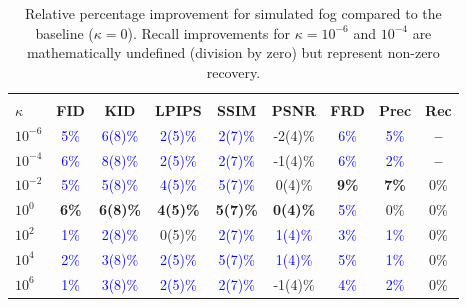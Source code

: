 \documentclass[twoside,11pt]{article}
\begin{document}
\begin{table}[ht!]
\centering
\renewcommand{\arraystretch}{1.4}
\setlength{\tabcolsep}{6pt}
\small
\begin{tabular}{lcccccccc}
\toprule
\rowcolor{gray!20}
\multicolumn{9}{c}{\textbf{Simulated Fog - Relative Improvement}} \\
\textbf{$\kappa$} & \textbf{FID} & \textbf{KID} & \textbf{LPIPS} & \textbf{SSIM} & \textbf{PSNR} & \textbf{FRD} & \textbf{Prec} & \textbf{Rec} \\
\midrule
$10^{-6}$    & \textcolor{blue}{5\%} & \textcolor{blue}{6(8)\%} & \textcolor{blue}{2(5)\%} & \textcolor{blue}{2(7)\%} & -2(4)\% & \textcolor{blue}{6\%} & \textcolor{blue}{5\%} & \textbf{\textcolor{green!50!black}{--}} \\
$10^{-4}$    & \textcolor{blue}{6\%} & \textcolor{blue}{8(8)\%} & \textcolor{blue}{2(5)\%} & \textcolor{blue}{2(7)\%} & -1(4)\% & \textcolor{blue}{6\%} & \textcolor{blue}{2\%} & \textbf{\textcolor{green!50!black}{--}} \\
$10^{-2}$    & \textcolor{blue}{5\%} & \textcolor{blue}{5(8)\%} & \textcolor{blue}{4(5)\%} & \textcolor{blue}{5(7)\%} & 0(4)\% & \textbf{\textcolor{green!50!black}{9\%}} & \textbf{\textcolor{green!50!black}{7\%}} & 0\% \\
$10^{0}$     & \textbf{\textcolor{green!50!black}{6\%}} & \textbf{\textcolor{green!50!black}{6(8)\%}} & \textbf{\textcolor{green!50!black}{4(5)\%}} & \textbf{\textcolor{green!50!black}{5(7)\%}} & \textbf{\textcolor{green!50!black}{0(4)\%}} & \textcolor{blue}{5\%} & 0\% & 0\% \\
$10^{2}$     & \textcolor{blue}{1\%} & \textcolor{blue}{2(8)\%} & 0(5)\% & \textcolor{blue}{2(7)\%} & \textcolor{blue}{1(4)\%} & \textcolor{blue}{3\%} & \textcolor{blue}{1\%} & 0\% \\
$10^{4}$     & \textcolor{blue}{2\%} & \textcolor{blue}{3(8)\%} & \textcolor{blue}{2(5)\%} & \textcolor{blue}{5(7)\%} & \textcolor{blue}{1(4)\%} & \textcolor{blue}{5\%} & \textcolor{blue}{1\%} & 0\% \\
$10^{6}$     & \textcolor{blue}{1\%} & \textcolor{blue}{3(8)\%} & \textcolor{blue}{2(5)\%} & \textcolor{blue}{2(7)\%} & -1(4)\% & \textcolor{blue}{4\%} & \textcolor{blue}{2\%} & 0\% \\
\bottomrule
\end{tabular}
\caption{Relative percentage improvement for simulated fog compared to the baseline ($\kappa = 0$). Recall improvements for $\kappa=10^{-6}$ and $10^{-4}$ are mathematically undefined (division by zero) but represent non-zero recovery.}
\label{tab:robustness_fog_rel}
\end{table}
\end{document}
